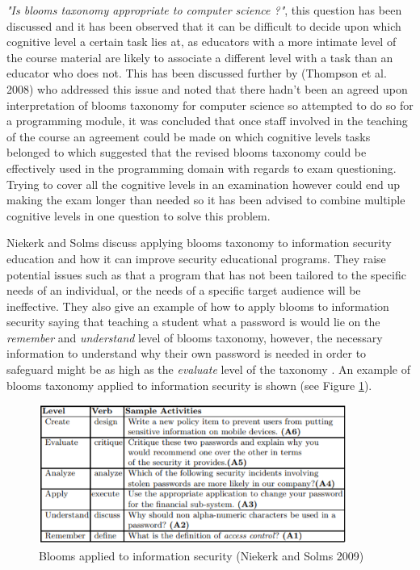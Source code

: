 \documentclass[12pt,a4paper]{article}
\begin{document}
\emph{"Is blooms taxonomy appropriate to computer science ?"}, this question has been discussed \cite{johnson2006bloom} and it has been observed that it can be difficult to decide upon which cognitive level a certain task lies at, as educators with a more intimate level of the course material are likely to associate a different level with a task than an educator who does not. This has been discussed further by (Thompson et al. 2008)\cite{thompson2008bloom} who addressed this issue and noted that there hadn't been an agreed upon interpretation of blooms taxonomy for computer science so attempted to do so for a programming module, it was concluded that once staff involved in the teaching of the course an agreement could be made on which cognitive levels tasks belonged to which suggested that the revised blooms taxonomy could be effectively used in the programming domain with regards to exam questioning. Trying to cover all the cognitive levels in an examination however could end up making the exam longer than needed so it has been advised \cite{scott2003bloom} to combine multiple cognitive levels in one question to solve this problem. 

Niekerk and Solms discuss applying blooms taxonomy to information security education and how it can improve security educational programs. They raise potential issues such as that a program that has not been tailored to the specific needs of an individual, or the needs of a specific target audience will be ineffective. They also give an example of how to apply blooms to information security saying that teaching a student what a password is would lie on the \emph{remember} and \emph{understand} level of blooms taxonomy, however, the necessary information to understand  why their own password is needed in order to safeguard might be as high as the \emph{evaluate} level of the taxonomy \cite{van2009using}. An example of blooms taxonomy applied to information security is shown (see Figure \ref{fig:fig3}).  

\begin{figure}[h]
    \centering
    \includegraphics[width=0.9\textwidth]{Figs/blooms2.PNG} 
    \caption{Blooms applied to information security (Niekerk and Solms 2009)}
    \label{fig:fig3}
\end{figure} 
\end{document}
